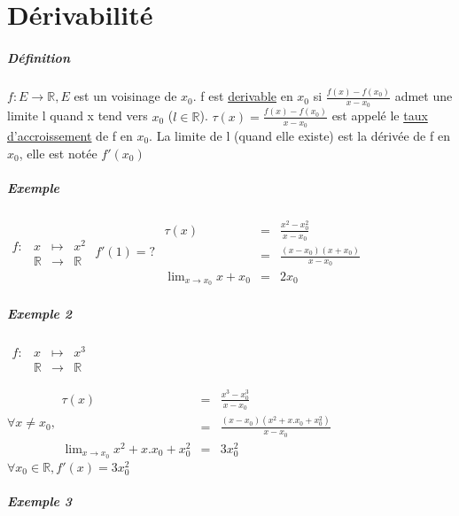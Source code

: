 \chapter{Dérivabilité}
\paragraph{Définition}
$f:E \rightarrow \mathbb{R}, E$ est un voisinage de $x_0$.
f est \ul{derivable} en $x_0$ si $\frac{f(x)-f(x_0)}{x-x_0}$ admet une limite l quand x tend vers $x_0$ ($l \in \mathbb{R}$).
$\tau (x) = \frac{f(x)-f(x_0)}{x-x_0}$ est appelé le \ul{taux d'accroissement} de f en $x_0$. La limite de l (quand elle existe) est la dérivée de f en $x_0$, elle est notée $f'(x_0)$

\paragraph{Exemple} $
\begin{array}{rcll}
	f:&x&\mapsto &x^2 \\
	& \mathbb{R} &\rightarrow &\mathbb{R}
\end{array}$ $f'(1) =  ?$      $\begin{array}{rcl}
								\tau (x) & = & \frac{x^2 - x_0^2}{x-x_0} \\
										&=& \frac{(x-x_0)(x+x_0)}{x-x_0} \\
										\lim_{x \to x_0} x+x_0 &=& 2x_0 
								\end{array} $

\paragraph{Exemple 2} 
$
\begin{array}{rcll}
	f:&x&\mapsto &x^3 \\
	& \mathbb{R} &\rightarrow &\mathbb{R} 
\end{array}$

$\forall x \neq x_0, \begin{array}{rcl}
\tau (x) &=& \frac{x^3 - x_0^3}{x - x_0} \\
 &=& \frac{(x-x_0)(x^2+x.x_0+x_0^2)}{x-x_0}\\
\lim_{x\to x_0} x^2 + x.x_0+x_0^2 &=& 3x_0^2 
\end{array}$
~\\
$\forall x_0 \in \mathbb{R}, f'(x) = 3x_0^2$

\paragraph{Exemple 3}

